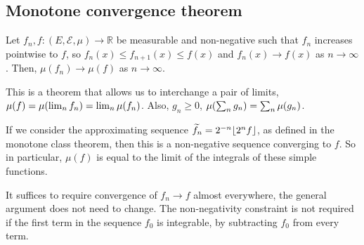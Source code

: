 \subsection{Monotone convergence theorem}
\begin{theorem}
	Let \( f_n, f \colon (E,\mathcal E,\mu) \to \mathbb R \) be measurable and non-negative such that \( f_n \) increases pointwise to \( f \), so \( f_n(x) \leq f_{n+1}(x) \leq f(x) \) and \( f_n(x) \to f(x) \) as \( n \to \infty \).
	Then, \( \mu(f_n) \to \mu(f) \) as \( n \to \infty \).
\end{theorem}
\begin{remark}
	This is a theorem that allows us to interchange a pair of limits, \( \mu(f) = \mu\qty(\lim_n f_n) = \lim_n \mu(f_n) \).
	Also, \( g_n \geq 0 \), \( \mu\qty(\sum_n g_n) = \sum_n \mu(g_n) \).

	If we consider the approximating sequence \( \widetilde f_n = 2^{-n} \lfloor2^n f\rfloor \), as defined in the monotone class theorem, then this is a non-negative sequence converging to \( f \).
	So in particular, \( \mu(f) \) is equal to the limit of the integrals of these simple functions.

	It suffices to require convergence of \( f_n \to f \) almost everywhere, the general argument does not need to change.
	The non-negativity constraint is not required if the first term in the sequence \( f_0 \) is integrable, by subtracting \( f_0 \) from every term.
\end{remark}
